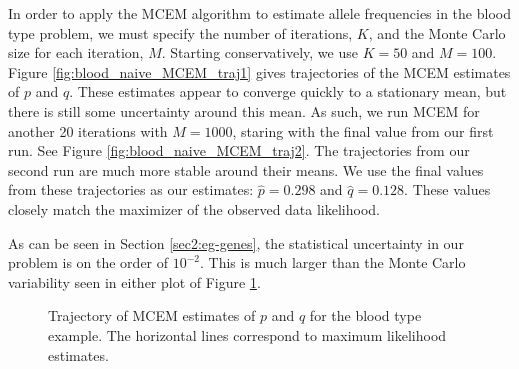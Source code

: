 \documentclass[11pt, oneside]{article}   	%
\begin{document}
In order to apply the MCEM algorithm to estimate allele frequencies in the blood type problem, we must specify the number of iterations, $K$, and the Monte Carlo size for each iteration, $M$. Starting conservatively, we use $K=50$ and $M=100$. Figure \ref{fig:blood_naive_MCEM_traj1} gives trajectories of the MCEM estimates of $p$ and $q$. These estimates appear to converge quickly to a stationary mean, but there is still some uncertainty around this mean. As such, we run MCEM for another 20 iterations with $M=1000$, staring with the final value from our first run. See Figure \ref{fig:blood_naive_MCEM_traj2}. The trajectories from our second run are much more stable around their means. We use the final values from these trajectories as our estimates: $\hat{p} = 0.298$ and $\hat{q} = 0.128$. These values closely match the maximizer of the observed data likelihood. 

As can be seen in Section \ref{sec2:eg-genes}, the statistical uncertainty in our problem is on the order of $10^{-2}$. This is much larger than the Monte Carlo variability seen in either plot of Figure \ref{fig:blood_naive_MCEM_traj}.

   



\begin{figure}
    \centering
    \caption{Trajectory of MCEM estimates of $p$ and $q$ for the blood type example. The horizontal lines correspond to maximum likelihood estimates.}
    \label{fig:blood_naive_MCEM_traj}
    
\end{figure}
\end{document}

